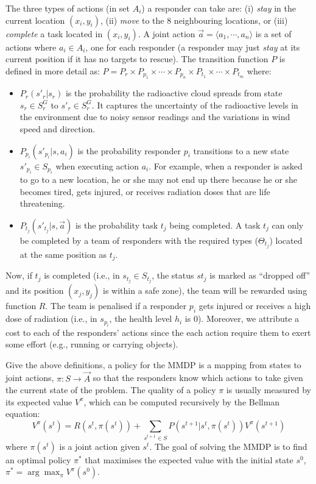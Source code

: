 The three types of actions  (in set $A_i$) a responder can take
are: (i) {\em stay} in the current location $(x_i, y_i)$, (ii) {\em
move} to the 8 neighbouring locations, or (iii) {\em complete} a
task located in $(x_i, y_i)$. A joint action $\vec{a}=\langle a_1,
\cdots, a_n \rangle$ is a set of actions where $a_i\in A_i$, one
for each responder (a responder may just \emph{stay} at its current
position if it has no targets to rescue). The transition function
$P$ is defined in more detail as: $P= P_r \times P_{p_1} \times
\cdots \times P_{p_n} \times P_{t_1} \times \cdots \times P_{t_m}$
where:
\begin{itemize}
    \itemsep=-2pt
    \item $P_r(s'_r|s_r)$ is the probability the radioactive
        cloud spreads from state $s_r\in S^G_r$ to $s'_r\in
        S^G_r$. It captures the uncertainty of the  radioactive
        levels in the environment due to  noisy sensor readings
        and the variations in wind speed and direction.
    \item $P_{p_i}(s'_{p_i}|s, a_i)$ is the probability
        responder $p_i$ transitions to a new state $s'_{p_i}\in
        S_{p_i}$ when executing action $a_i$. For example, when
        a responder is asked to go to a new location, he or she
        may not end up there because he or she becomes tired,
        gets injured, or receives radiation doses that are life
        threatening.
    \item $P_{t_j}(s'_{t_j}|s, \vec{a})$ is the probability
        task $t_j$ being completed. A task $t_j$ can only be completed by a
        team of responders with the required types ($\Theta_{t_j}$) located at the
        same position as $t_j$.
\end{itemize}

Now,  if  $t_j$ is completed (i.e., in $s_{t_j}\in S_{t_j}$, the
status $st_j$ is marked as ``dropped off'' and its position $(x_j,
y_j)$ is within a safe zone), the team will be rewarded using
function $R$. The team is penalised if a responder $p_i$ gets
injured or receives a high dose of radiation (i.e., in $s_{p_i}$,
the health level $h_i$ is 0). Moreover, we attribute a cost to each
of the responders' actions since the each  action require them to
exert some effort (e.g., running or carrying objects).


Give the above definitions, a policy for the MMDP is a mapping from
states to joint actions, $\pi: S \rightarrow \vec{A}$ so that the
responders know which actions to take given the current state of
the problem. The quality of a policy $\pi$ is usually measured by
its expected value $V^\pi$, which can be computed recursively by
the Bellman equation:
\begin{equation}
  V^\pi(s^t) = R(s^t, \pi(s^t)) + \!\!\!\sum_{s^{t+1}\in S}\!\!\!
  P(s^{t+1}|s^t, \pi(s^t)) V^\pi(s^{t+1})
\end{equation}
where $\pi(s^t)$ is a joint action given $s^t$. The goal of solving
the MMDP is to find an optimal policy $\pi^*$ that maximises the
expected value with the initial state $s^0$, $\pi^* =
\arg\max_{\pi} V^\pi(s^0)$.

